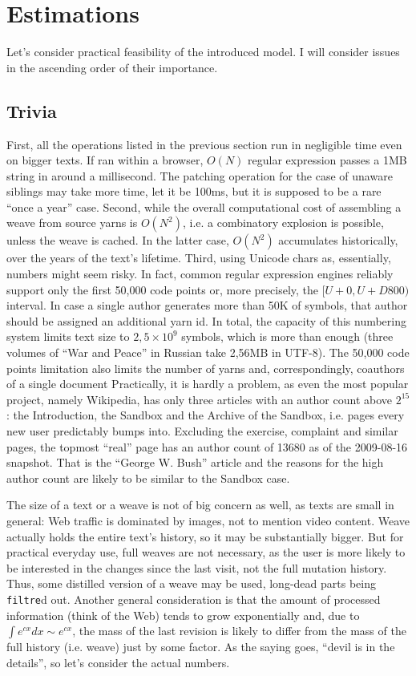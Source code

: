 \documentclass{acm_proc_article-sp}
\begin{document}
\section{Estimations} \label{sec:estim}

Let's consider practical feasibility of the introduced model.
I will consider issues in the ascending order of their
importance. \\

\subsection{Trivia}
First, all the operations
listed in the previous section run in negligible time
even on bigger texts. If ran within a browser, $O(N)$
regular expression passes a 1MB string in around a millisecond.
The patching operation for the case of unaware siblings may
take more time, let it be 100ms, but it is supposed to be a rare
``once a year'' case.
Second, while the overall computational cost of assembling a weave
from source yarns is $O(N^{2})$, i.e. a combinatory
explosion is possible, unless the weave is cached. In the
latter case, $O(N^{2})$ accumulates historically, over the
years of the text's lifetime. 
Third, using Unicode chars as, essentially, numbers
might seem risky. In fact, common regular expression engines
reliably support only the first 50,000 code points or, more
precisely, the $[U+0,U+D800)$ interval. In case a single author
generates more than 50K of symbols, that author should be assigned
an additional yarn id. In total, the capacity of this numbering
system limits text size to $2,5\times10^9$ symbols, which is more
than enough (three volumes of ``War and Peace'' in Russian
take 2,56MB in UTF-8). 
The 50,000 code points limitation also limits the number of yarns
and, correspondingly, coauthors of a single document
Practically, it is hardly a problem, as even the most popular
project, namely Wikipedia, has only three articles with an author
count above $2^{15}$: the Introduction, the Sandbox and the
Archive of the Sandbox, i.e. pages every new user predictably
bumps into. Excluding the exercise, complaint and similar pages,
the topmost ``real'' page has an author count of 13680 as of
the 2009-08-16 snapshot. That is the ``George W. Bush'' article
and the reasons for the high author count are likely to be
similar to the Sandbox case.


The size of a text or a weave is not of big concern as well,
as texts are small in general: Web traffic 
is dominated by images, not to mention video content.
Weave actually holds the entire text's history, so it may
be substantially bigger. But for practical everyday use,
full weaves are
not necessary, as the user is more likely to be interested
in the changes since the last visit, not the full mutation
history. Thus, some distilled version of a weave may be
used, long-dead parts being {\tt filtre}d out. Another general
consideration is that the amount of processed information
(think of the Web) tends to grow exponentially and, due to
$\int e^{cx}dx \sim e^{cx}$, the mass of the last
revision is likely to differ from the mass of the full
history (i.e. weave) just by some factor. As the saying
goes, ``devil is in the details'', so let's consider the
actual numbers.
\end{document}
